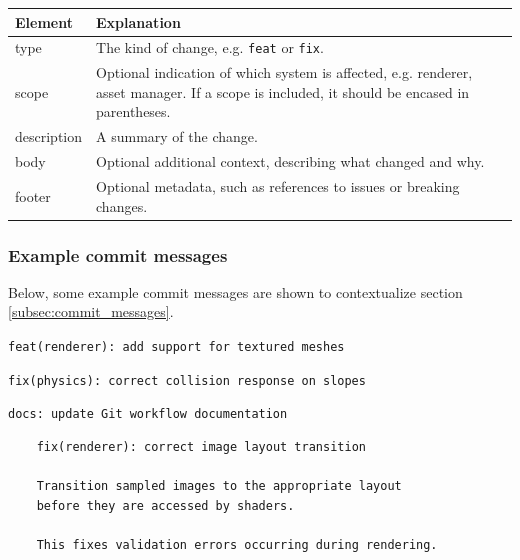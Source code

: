 \documentclass[12pt,a4paper]{article}
\begin{document}
        \begin{table}[H]
        \centering
        \begin{tabularx}{\linewidth}{l|>{\raggedright\arraybackslash}X}
        \textbf{Element} & \textbf{Explanation}                                                                                                                         \\ \hline
        type             & The kind of change, e.g. \verb|feat| or \verb|fix|.                                                                                          \\ \hline
        scope            & Optional indication of which system is affected, e.g. renderer, asset manager.  If a scope is included, it should be encased in parentheses. \\ \hline
        description      & A summary of the change.                                                                                                               \\ \hline
        body             & Optional additional context, describing what changed and why.                                                                                \\ \hline
        footer           & Optional metadata, such as references to issues or breaking changes.                                                                        
        \end{tabularx}
        \end{table}

        \subsubsection{Example commit messages}
            Below, some example commit messages are shown to contextualize section \ref{subsec:commit_messages}.
            
            \verb|feat(renderer): add support for textured meshes| \vspace{2mm}
            
            \verb|fix(physics): correct collision response on slopes| \vspace{2mm}
            
            \verb|docs: update Git workflow documentation| \vspace{2mm}
            
            \begin{verbatim}
    fix(renderer): correct image layout transition
    
    Transition sampled images to the appropriate layout
    before they are accessed by shaders.
    
    This fixes validation errors occurring during rendering.
            \end{verbatim}
\end{document}
